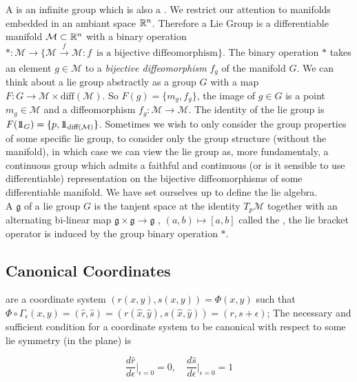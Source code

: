 \documentclass[12pt]{article}
\begin{document}
A  is an infinite group which is also a . We restrict our attention to manifolds embedded in an ambiant space $\mathbb{R}^n$. Therefore a Lie Group is a differentiable manifold $\mathcal M\subset \mathbb{R}^n$ with a binary operation $\ast : \mathcal M \to \{\mathcal M \xrightarrow[]{f} \mathcal M : f\,\text{ is a bijective diffeomorphism}\}$. The binary operation $\ast$ takes an element $g\in \mathcal M$ to a \textit{bijective diffeomorphism} $f_g$ of the manifold $G$. We can think about a lie group abstractly as a group $G$ with a map $F : G\to \mathcal M \times \text{diff} (\mathcal M)$. So $F(g) = \{m_g,f_g\}$, the image of $g\in G$ is a point $m_g\in\mathcal M$ and a diffeomorphism $f_g : \mathcal M \to \mathcal M$. The identity of the lie group is $F(1\!\!1_G) = \{p , 1\!\!1_{\text{diff}(\mathcal M)}\}$. Sometimes we wish to only consider the group properties of some specific lie group, to consider only the group structure (without the manifold), in which case we can view the lie group as, more fundamentaly, a continuous group which admits a faithful and continuous (or is it sensible to use differentiable) representation on the bijective diffeomorphisms of some differentiable manifold. We have set ourselves up to define the lie algebra. \\

A  $\mathfrak g$ of a lie group $G$ is the tanjent space at the identity $T_p\mathcal M$ together with an alternating bi-linear map $\mathfrak g\times \mathfrak g \to \mathfrak g$ , $(a,b)\mapsto [a,b]$ called the , the lie bracket operator is induced by the group binary operation $\ast$. 

 
\subsection{Canonical Coordinates}
 are a coordinate system $(r(x,y),s(x,y)) =\Phi (x,y)$ such that $\Phi\circ \Gamma_\epsilon (x,y) = (\hat r, \hat s) = (r(\hat x,\hat y),s(\hat x,\hat y)) = (r,s+\epsilon)$; The necessary and sufficient condition for a coordinate system to be canonical with respect to some lie symmetry (in the plane) is 

\begin{equation}\label{eq:canonical coordinates condition}
    \frac{d\hat r}{d\epsilon}\bigg|_{\epsilon=0}=0,\quad \frac{d\hat s}{d\epsilon}\bigg|_{\epsilon=0}=1
\end{equation}
\end{document}

